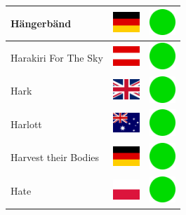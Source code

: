 \documentclass[12pt, a4paper, twoside]{report}
\begin{document}
\begin{center}
\begin{longtable}{|p{5cm}|p{2cm}|p{2cm}|}
 Hängerbänd                                                 & \includegraphics[width=1cm]{../4x3/de} &   \includegraphics[width=1cm]{../likes/y} \\ \hline
 Harakiri For The Sky                                       & \includegraphics[width=1cm]{../4x3/at} &   \includegraphics[width=1cm]{../likes/y} \\ \hline
 Hark                                                       & \includegraphics[width=1cm]{../4x3/gb} &   \includegraphics[width=1cm]{../likes/y} \\ \hline
 Harlott                                                    & \includegraphics[width=1cm]{../4x3/au} &   \includegraphics[width=1cm]{../likes/y} \\ \hline
 Harvest their Bodies                                       & \includegraphics[width=1cm]{../4x3/de} &   \includegraphics[width=1cm]{../likes/y} \\ \hline
 Hate                                                       & \includegraphics[width=1cm]{../4x3/pl} &   \includegraphics[width=1cm]{../likes/y} \\ \hline

\end{longtable}
\end{center}
\end{document}
